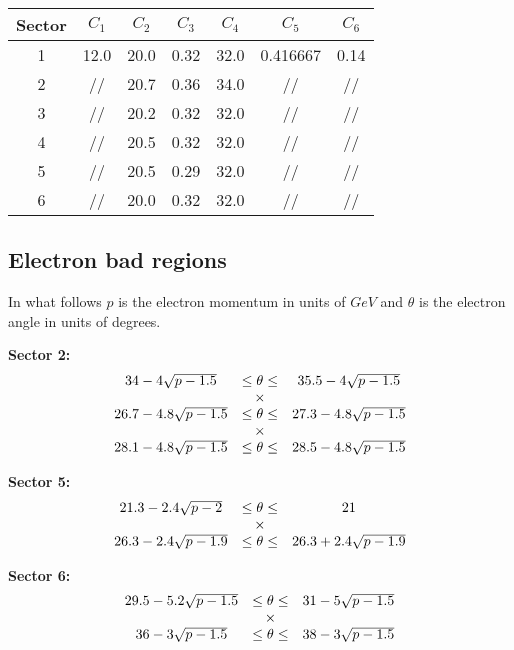\vspace{1cm}
\begin{table}[h]
 \begin{center}
  \begin{tabular}{|c|c|c|c|c|c|c|}
    \hline 
   Sector & $C_1$ & $C_2$ & $C_3$ & $C_4$     & $C_5$ & $C_6$ \\
    \hline  
   1 &     12.0 &  20.0 &  0.32 &  32.0 &  0.416667 &  0.14 \\
   2 &     //   &  20.7 &  0.36 &  34.0 &  //       &  // \\
   3 &     //   &  20.2 &  0.32 &  32.0 &  //       &  // \\
   4 &     //   &  20.5 &  0.32 &  32.0 &  //       &  // \\
   5 &     //   &  20.5 &  0.29 &  32.0 &  //       &  // \\
   6 &     //   &  20.0 &  0.32 &  32.0 &  //       &  // \\
 \hline
  \end{tabular}
 \end{center} 
\end{table}

\subsection{Electron bad regions}
In what follows $p$ is the electron momentum in units of $GeV$ and $\theta$ is the
electron angle in units of degrees.

{\bf Sector 2:}
$$
\begin{array}{c c c}
34 -4\sqrt{p-1.5} & \le \theta \le  & 35.5 -4\sqrt{p-1.5} \\
& \times & \\
26.7 -4.8\sqrt{p-1.5} & \le \theta \le & 27.3 -4.8\sqrt{p-1.5} \\
& \times & \\
28.1 -4.8\sqrt{p-1.5} & \le \theta \le & 28.5 -4.8\sqrt{p-1.5} \\
\end{array}
$$

{\bf Sector 5:}
$$
\begin{array}{c c c}
21.3 -2.4\sqrt{p-2} & \le \theta \le & 21 \\
& \times & \\
26.3 -2.4\sqrt{p-1.9} & \le \theta \le & 26.3 + 2.4\sqrt{p-1.9} \\
\end{array}
$$

{\bf Sector 6:}
$$
\begin{array}{c c c}
29.5 -5.2\sqrt{p-1.5} & \le \theta \le  & 31 -5\sqrt{p-1.5} \\
& \times & \\
36 -3\sqrt{p-1.5} & \le \theta \le & 38 -3\sqrt{p-1.5} \\
\end{array}
$$

